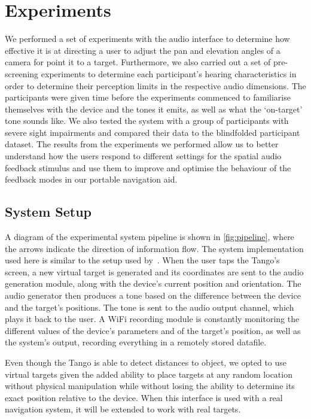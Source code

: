 \documentclass[acmsmall]{acmart}
\begin{document}
\section{Experiments}\label{sec:experiments}

We performed a set of experiments with the audio interface to determine how effective it is at directing a user to adjust the pan and elevation angles of a camera for point it to a target.
Furthermore, we also carried out a set of pre-screening experiments to determine each participant's hearing characteristics in order to determine their perception limits in the respective audio dimensions.
The participants were given time before the experiments commenced to familiarise themselves with the device and the tones it emits, as well as what the `on-target' tone sounds like.
We also tested the system with a group of participants with severe sight impairments and compared their data to the blindfolded participant dataset.
The results from the experiments we performed allow us to better understand how the users respond to different settings for the spatial audio feedback stimulus and use them to improve and optimise the behaviour of the feedback modes in our portable navigation aid.

\subsection{System Setup}

A diagram of the experimental system pipeline is shown in \cref{fig:pipeline}, where the arrows indicate the direction of information flow.
The system implementation used here is similar to the setup used by~\citet{lock2019bone}.
When the user taps the Tango's screen, a new virtual target is generated and its coordinates are sent to the audio generation module, along with the device's current position and orientation.
The audio generator then produces a tone based on the difference between the device and the target's positions.
The tone is sent to the audio output channel, which plays it back to the user.
A WiFi recording module is constantly monitoring the different values of the device's parameters and of the target's position, as well as the system's output, recording everything in a remotely stored datafile. 

Even though the Tango is able to detect distances to object, we opted to use virtual targets given the added ability to place targets at any random location without physical manipulation while without losing the ability to determine its exact position relative to the device.
When this interface is used with a real navigation system, it will be extended to work with real targets.
\end{document}
